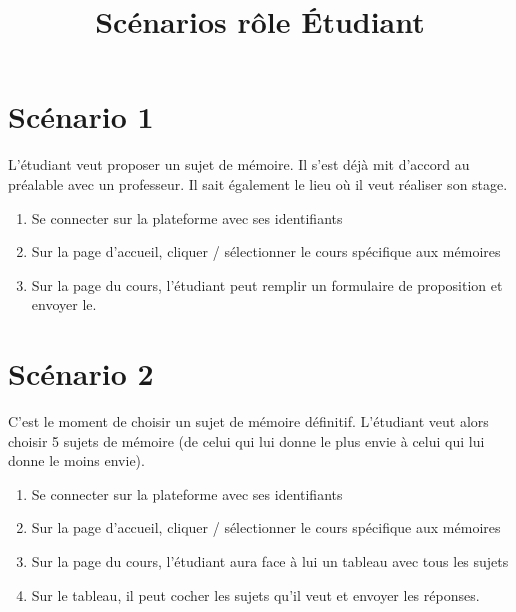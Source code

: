 \documentclass[a4paper, 11pt]{article}
\title{Scénarios rôle \bf \'Etudiant}
\author{}
\begin{document}
\maketitle

\section*{Scénario 1}
L'étudiant veut proposer un sujet de mémoire. Il s'est déjà mit d'accord au préalable avec un professeur. Il sait également le lieu où il veut réaliser son stage.

\begin{tcolorbox}
    \begin{enumerate}
        \item Se connecter sur la plateforme avec ses identifiants
        \item Sur la page d'accueil, cliquer / sélectionner le cours spécifique aux mémoires
        \item Sur la page du cours, l'étudiant peut remplir un formulaire de proposition et envoyer le.
    \end{enumerate}
\end{tcolorbox}

\section*{Scénario 2}
C'est le moment de choisir un sujet de mémoire définitif. L'étudiant veut alors choisir 5 sujets de mémoire (de celui qui lui donne le plus envie à celui qui lui donne le moins envie).

\begin{tcolorbox}
    \begin{enumerate}
        \item Se connecter sur la plateforme avec ses identifiants
        \item Sur la page d'accueil, cliquer / sélectionner le cours spécifique aux mémoires
        \item Sur la page du cours, l'étudiant aura face à lui un tableau avec tous les sujets
        \item Sur le tableau, il peut cocher les sujets qu'il veut et envoyer les réponses.
        \end{enumerate}
\end{tcolorbox}
\end{document}
